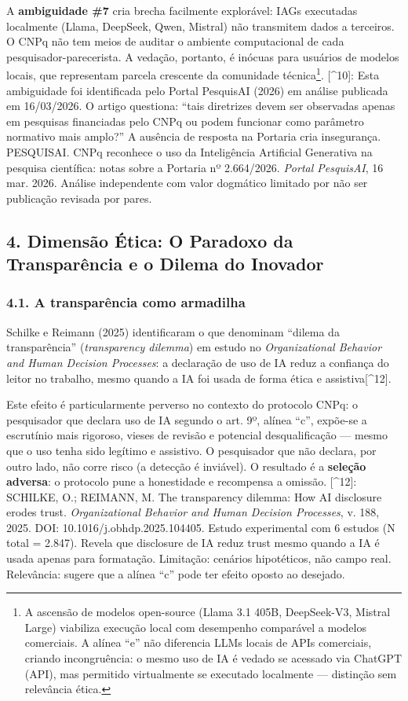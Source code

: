\documentclass[
  12pt,
  a4paper,
  brazil
]{article}
\begin{document}
A \textbf{ambiguidade \#7} cria brecha facilmente explorável: IAGs
executadas localmente (Llama, DeepSeek, Qwen, Mistral) não transmitem
dados a terceiros. O CNPq não tem meios de auditar o ambiente
computacional de cada pesquisador-parecerista. A vedação, portanto, é
inócuas para usuários de modelos locais, que representam parcela
crescente da comunidade técnica\footnote{A ascensão de modelos
  open-source (Llama 3.1 405B, DeepSeek-V3, Mistral Large) viabiliza
  execução local com desempenho comparável a modelos comerciais. A
  alínea ``e'' não diferencia LLMs locais de APIs comerciais, criando
  incongruência: o mesmo uso de IA é vedado se acessado via ChatGPT
  (API), mas permitido virtualmente se executado localmente ---
  distinção sem relevância ética.}. {[}\^{}10{]}: Esta ambiguidade foi
identificada pelo Portal PesquisAI (2026) em análise publicada em
16/03/2026. O artigo questiona: ``tais diretrizes devem ser observadas
apenas em pesquisas financiadas pelo CNPq ou podem funcionar como
parâmetro normativo mais amplo?'' A ausência de resposta na Portaria
cria insegurança. PESQUISAI. CNPq reconhece o uso da Inteligência
Artificial Generativa na pesquisa científica: notas sobre a Portaria nº
2.664/2026. \emph{Portal PesquisAI}, 16 mar. 2026. Análise independente
com valor dogmático limitado por não ser publicação revisada por pares.

\subsection{4. Dimensão Ética: O Paradoxo da Transparência e o Dilema do
Inovador}\label{dimensuxe3o-uxe9tica-o-paradoxo-da-transparuxeancia-e-o-dilema-do-inovador}

\subsubsection{4.1. A transparência como
armadilha}\label{a-transparuxeancia-como-armadilha}

Schilke e Reimann (2025) identificaram o que denominam ``dilema da
transparência'' (\emph{transparency dilemma}) em estudo no
\emph{Organizational Behavior and Human Decision Processes}: a
declaração de uso de IA reduz a confiança do leitor no trabalho, mesmo
quando a IA foi usada de forma ética e assistiva{[}\^{}12{]}.

Este efeito é particularmente perverso no contexto do protocolo CNPq: o
pesquisador que declara uso de IA segundo o art. 9º, alínea ``c'',
expõe-se a escrutínio mais rigoroso, vieses de revisão e potencial
desqualificação --- mesmo que o uso tenha sido legítimo e assistivo. O
pesquisador que não declara, por outro lado, não corre risco (a detecção
é inviável). O resultado é a \textbf{seleção adversa}: o protocolo pune
a honestidade e recompensa a omissão. {[}\^{}12{]}: SCHILKE, O.;
REIMANN, M. The transparency dilemma: How AI disclosure erodes trust.
\emph{Organizational Behavior and Human Decision Processes}, v. 188,
2025. DOI: 10.1016/j.obhdp.2025.104405. Estudo experimental com 6
estudos (N total = 2.847). Revela que disclosure de IA reduz trust mesmo
quando a IA é usada apenas para formatação. Limitação: cenários
hipotéticos, não campo real. Relevância: sugere que a alínea ``c'' pode
ter efeito oposto ao desejado.
\end{document}
